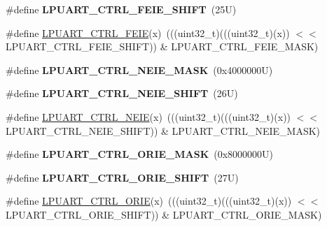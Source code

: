 \begin{DoxyCompactItemize}
\#define {\bfseries L\+P\+U\+A\+R\+T\+\_\+\+C\+T\+R\+L\+\_\+\+F\+E\+I\+E\+\_\+\+S\+H\+I\+FT}~(25\+U)
\item 
\#define \mbox{\hyperlink{group___l_p_u_a_r_t___register___masks_gadaf2a4b2dad0928706aa63097880bd33}{L\+P\+U\+A\+R\+T\+\_\+\+C\+T\+R\+L\+\_\+\+F\+E\+IE}}(x)~(((uint32\+\_\+t)(((uint32\+\_\+t)(x)) $<$$<$ L\+P\+U\+A\+R\+T\+\_\+\+C\+T\+R\+L\+\_\+\+F\+E\+I\+E\+\_\+\+S\+H\+I\+FT)) \& L\+P\+U\+A\+R\+T\+\_\+\+C\+T\+R\+L\+\_\+\+F\+E\+I\+E\+\_\+\+M\+A\+SK)
\item 
\mbox{\label{group___l_p_u_a_r_t___register___masks_ga9bb78c865ac75751227638c3bc5661f0}} 
\#define {\bfseries L\+P\+U\+A\+R\+T\+\_\+\+C\+T\+R\+L\+\_\+\+N\+E\+I\+E\+\_\+\+M\+A\+SK}~(0x4000000\+U)
\item 
\mbox{\label{group___l_p_u_a_r_t___register___masks_gac67243e929ea991342dc3dfba6a6e5de}} 
\#define {\bfseries L\+P\+U\+A\+R\+T\+\_\+\+C\+T\+R\+L\+\_\+\+N\+E\+I\+E\+\_\+\+S\+H\+I\+FT}~(26\+U)
\item 
\#define \mbox{\hyperlink{group___l_p_u_a_r_t___register___masks_ga6d8ca1e07224637c737e7ee7bcd66bfa}{L\+P\+U\+A\+R\+T\+\_\+\+C\+T\+R\+L\+\_\+\+N\+E\+IE}}(x)~(((uint32\+\_\+t)(((uint32\+\_\+t)(x)) $<$$<$ L\+P\+U\+A\+R\+T\+\_\+\+C\+T\+R\+L\+\_\+\+N\+E\+I\+E\+\_\+\+S\+H\+I\+FT)) \& L\+P\+U\+A\+R\+T\+\_\+\+C\+T\+R\+L\+\_\+\+N\+E\+I\+E\+\_\+\+M\+A\+SK)
\item 
\mbox{\label{group___l_p_u_a_r_t___register___masks_ga3fe567dfdcf89e828b347a427b0b3361}} 
\#define {\bfseries L\+P\+U\+A\+R\+T\+\_\+\+C\+T\+R\+L\+\_\+\+O\+R\+I\+E\+\_\+\+M\+A\+SK}~(0x8000000\+U)
\item 
\mbox{\label{group___l_p_u_a_r_t___register___masks_ga1dc6af0729867e4acfc6f294b2d6b9e0}} 
\#define {\bfseries L\+P\+U\+A\+R\+T\+\_\+\+C\+T\+R\+L\+\_\+\+O\+R\+I\+E\+\_\+\+S\+H\+I\+FT}~(27\+U)
\item 
\#define \mbox{\hyperlink{group___l_p_u_a_r_t___register___masks_gae00a00aa96fe6647577e5415d9a1299f}{L\+P\+U\+A\+R\+T\+\_\+\+C\+T\+R\+L\+\_\+\+O\+R\+IE}}(x)~(((uint32\+\_\+t)(((uint32\+\_\+t)(x)) $<$$<$ L\+P\+U\+A\+R\+T\+\_\+\+C\+T\+R\+L\+\_\+\+O\+R\+I\+E\+\_\+\+S\+H\+I\+FT)) \& L\+P\+U\+A\+R\+T\+\_\+\+C\+T\+R\+L\+\_\+\+O\+R\+I\+E\+\_\+\+M\+A\+SK)
$$
\end{DoxyCompactItemize}
